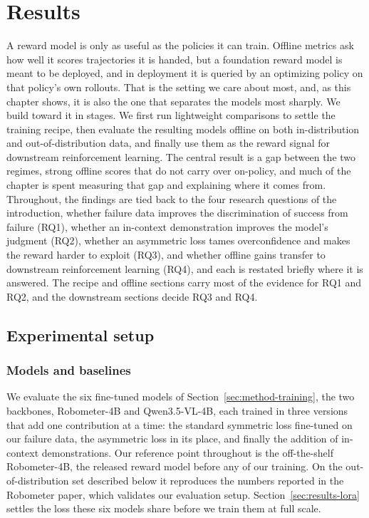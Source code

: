 \chapter{Results}
\label{sec:results}

A reward model is only as useful as the policies it can train. Offline metrics ask how well it scores trajectories it is handed, but a foundation reward model is meant to be deployed, and in deployment it is queried by an optimizing policy on that policy's own rollouts. That is the setting we care about most, and, as this chapter shows, it is also the one that separates the models most sharply. We build toward it in stages. We first run lightweight comparisons to settle the training recipe, then evaluate the resulting models offline on both in-distribution and out-of-distribution data, and finally use them as the reward signal for downstream reinforcement learning. The central result is a gap between the two regimes, strong offline scores that do not carry over on-policy, and much of the chapter is spent measuring that gap and explaining where it comes from. Throughout, the findings are tied back to the four research questions of the introduction, whether failure data improves the discrimination of success from failure (RQ1), whether an in-context demonstration improves the model's judgment (RQ2), whether an asymmetric loss tames overconfidence and makes the reward harder to exploit (RQ3), and whether offline gains transfer to downstream reinforcement learning (RQ4), and each is restated briefly where it is answered. The recipe and offline sections carry most of the evidence for RQ1 and RQ2, and the downstream sections decide RQ3 and RQ4.

\section{Experimental setup}
\label{sec:exp-setup}

\subsection{Models and baselines}

We evaluate the six fine-tuned models of Section~\ref{sec:method-training}, the two backbones, Robometer-4B and Qwen3.5-VL-4B, each trained in three versions that add one contribution at a time: the standard symmetric loss fine-tuned on our failure data, the asymmetric loss in its place, and finally the addition of in-context demonstrations. Our reference point throughout is the off-the-shelf Robometer-4B, the released reward model before any of our training. On the out-of-distribution set described below it reproduces the numbers reported in the Robometer paper, which validates our evaluation setup. Section~\ref{sec:results-lora} settles the loss these six models share before we train them at full scale.


